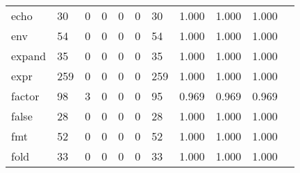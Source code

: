 \begin{longtable}{lp{1.10cm}p{1.10cm}p{1.10cm}p{1.10cm}p{1.10cm}p{1.10cm}p{1.10cm}p{1.10cm}p{1.10cm}p{1.10cm}}
echo      &                     30 &                                  0 &                                 0 &                                0 &                                 0 &                              30 &                          1.000 &                                 1.000 &                               1.000 \\
env       &                     54 &                                  0 &                                 0 &                                0 &                                 0 &                              54 &                          1.000 &                                 1.000 &                               1.000 \\
expand    &                     35 &                                  0 &                                 0 &                                0 &                                 0 &                              35 &                          1.000 &                                 1.000 &                               1.000 \\
expr      &                    259 &                                  0 &                                 0 &                                0 &                                 0 &                             259 &                          1.000 &                                 1.000 &                               1.000 \\
factor    &                     98 &                                  3 &                                 0 &                                0 &                                 0 &                              95 &                          0.969 &                                 0.969 &                               0.969 \\
false     &                     28 &                                  0 &                                 0 &                                0 &                                 0 &                              28 &                          1.000 &                                 1.000 &                               1.000 \\
fmt       &                     52 &                                  0 &                                 0 &                                0 &                                 0 &                              52 &                          1.000 &                                 1.000 &                               1.000 \\
fold      &                     33 &                                  0 &                                 0 &                                0 &                                 0 &                              33 &                          1.000 &                                 1.000 &                               1.000 \\

\end{longtable}
